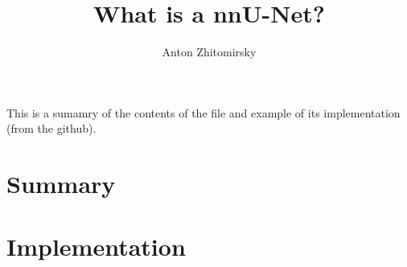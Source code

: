 \documentclass[11pt]{article}
\title{What is a nnU-Net?}
\author{Anton Zhitomirsky}
\begin{document}
\maketitle

This is a sumamry of the contents of the file \cite{nnunet} and example of its implementation (from the github).

\section{Summary}



\section{Implementation}

\printbibliography
\end{document}
